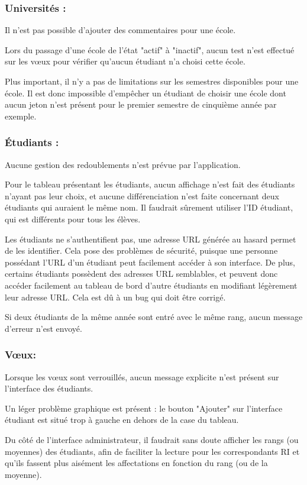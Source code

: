 \subsubsection{Universités :}
Il n'est pas possible d'ajouter des commentaires pour une école.

Lors du passage d'une école de l'état "actif" à "inactif", aucun test n'est effectué sur les vœux pour vérifier qu'aucun étudiant n'a choisi cette école.

Plus important, il n'y a pas de limitations sur les semestres disponibles pour une école. Il est donc impossible d'empêcher un étudiant de choisir une école dont aucun jeton n'est présent pour le premier semestre de cinquième année par exemple.


\subsubsection{Étudiants :}
Aucune gestion des redoublements n'est prévue par l'application.

Pour le tableau présentant les étudiants, aucun affichage n'est fait des étudiants n'ayant pas leur choix, et aucune différenciation n'est faite concernant deux étudiants qui auraient le même nom. Il faudrait sûrement utiliser l'ID étudiant, qui est différents pour tous les élèves.

Les étudiants ne s'authentifient pas, une adresse URL générée au hasard permet de les identifier. Cela pose des problèmes de sécurité, puisque une personne possédant l'URL d'un étudiant peut facilement accéder à son interface. De plus, certains étudiants possèdent des adresses URL semblables, et peuvent donc accéder facilement au tableau de bord d'autre étudiants en modifiant légèrement leur adresse URL. Cela est dû à un bug qui doit être corrigé.

Si deux étudiants de la même année sont entré avec le même rang, aucun message d'erreur n'est envoyé.


\subsubsection{Vœux:}
Lorsque les vœux sont verrouillés, aucun message explicite n'est présent sur l'interface des étudiants.

Un léger problème graphique est présent : le bouton "Ajouter" sur l'interface étudiant est situé trop à gauche en dehors de la case du tableau.

Du côté de l'interface administrateur, il faudrait sans doute afficher les rangs (ou moyennes) des étudiants, afin de faciliter la lecture pour les correspondants RI et qu'ils fassent plus aisément les affectations en fonction du rang (ou de la moyenne).


